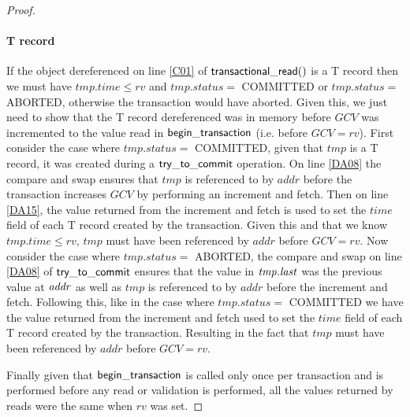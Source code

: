 \begin{proof}
\paragraph{T record} If the object dereferenced on line \ref{C01} of $\sf{transactional\_read}()$ is a T record then we must have $\mathit{tmp.time} \leq \mathit{rv}$ and 
$\mathit{tmp.status} = $ COMMITTED or $\mathit{tmp.status} = $ ABORTED, otherwise the transaction would have aborted.
Given this, we just need to show that the T record dereferenced was in memory before $\mathit{GCV}$ was incremented to the value
read in $\sf{begin\_transaction}$ (i.e. before $\mathit{GCV} = \mathit{rv}$).
First consider the case where $\mathit{tmp.status} = $ COMMITTED, given that $\mathit{tmp}$ is a T record, it was created
during a $\sf{try\_to\_commit}$ operation.
On line \ref{DA08} the compare and swap ensures that $\mathit{tmp}$ is referenced to by $\mathit{addr}$ before the transaction
increases $\mathit{GCV}$ by performing an increment and fetch.
Then on line \ref{DA15}, the value returned from the increment and fetch is used to set the $\mathit{time}$ field of each T record
created by the transaction.
Given this and that we know $\mathit{tmp.time} \leq \mathit{rv}$, $\mathit{tmp}$ must have been referenced by $\mathit{addr}$ before
$\mathit{GCV} = \mathit{rv}$.
Now consider the case where $\mathit{tmp.status} = $ ABORTED, the compare and swap on line \ref{DA08} of $\sf{try\_to\_commit}$ ensures
that the value in $\ms{tmp.last}$ was the previous value at $\ms{addr}$ as well as $\mathit{tmp}$ is referenced to by $\mathit{addr}$
before the increment and fetch.
Following this, like in the case where $\mathit{tmp.status} = $ COMMITTED we have the value returned from the increment and fetch
used to set the $\mathit{time}$ field of each T record created by the transaction.
Resulting in the fact that $\mathit{tmp}$ must have been referenced by $\mathit{addr}$ before $\mathit{GCV} = \mathit{rv}$.

Finally given that $\sf{begin\_transaction}$ is called only once per transaction and is performed before any read or validation is performed,
all the values returned by reads were the same when $\mathit{rv}$ was set.
\end{proof}




